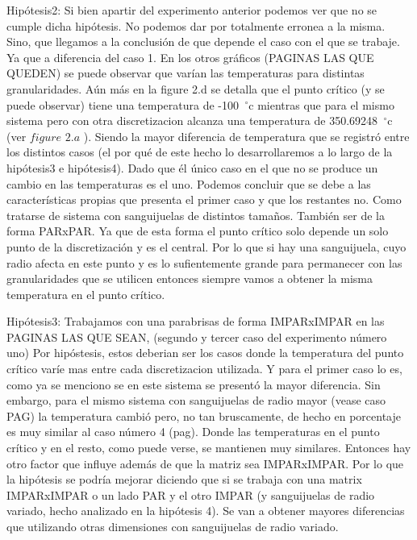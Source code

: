 Hipótesis2: Si bien apartir del experimento anterior podemos ver que no se cumple dicha hipótesis. No podemos dar por totalmente erronea a la misma. Sino, que llegamos a la conclusión de que depende el caso con el que se trabaje. Ya que a diferencia del caso 1. En los otros gráficos (PAGINAS LAS QUE QUEDEN) se puede observar que varían las temperaturas para distintas granularidades. Aún más en la figure 2.d se detalla que el punto crítico (y se puede observar) tiene una temperatura de -100\hspace{-1.5mm}$\phantom{a}^{\circ}$c mientras que para el mismo sistema pero con otra discretizacion alcanza una temperatura de  350.69248\hspace{-1.5mm}$\phantom{a}^{\circ}$c (ver $figure$ $2.a$ ). Siendo la mayor diferencia de temperatura que se registró entre los distintos casos (el por qué de este hecho lo desarrollaremos a lo largo de la hipótesis3 e hipótesis4). Dado que él único caso en el que no se produce un cambio en las temperaturas es el uno. Podemos concluir que se debe a las características propias que presenta el primer caso y que los restantes no. Como tratarse de sistema con sanguijuelas de distintos tamaños. También ser de la forma PARxPAR. Ya que de esta forma el punto crítico solo depende un solo punto de la discretización y es el central. Por lo que si hay una sanguijuela, cuyo radio afecta en este punto y es lo sufientemente grande para permanecer con las granularidades que se utilicen entonces siempre vamos a obtener la misma temperatura en el punto crítico. \newline \newline


Hipótesis3: Trabajamos con una parabrisas de forma IMPARxIMPAR en las PAGINAS LAS QUE SEAN, (segundo y tercer caso del experimento número uno) Por hipóstesis, estos deberian ser los casos donde la temperatura del punto crítico varíe mas entre cada discretizacion utilizada. Y para el primer caso lo es, como ya se menciono se en este sistema se presentó la mayor diferencia. Sin embargo, para el mismo sistema con sanguijuelas de radio mayor (vease caso PAG) la temperatura cambió pero, no tan bruscamente, de hecho en porcentaje es muy similar al caso número 4 (pag). Donde las temperaturas en el punto crítico y en el resto, como puede verse, se mantienen muy similares. Entonces hay otro factor que influye además de que la matriz sea IMPARxIMPAR. Por lo que la hipótesis se podría mejorar diciendo que si se trabaja con una matrix IMPARxIMPAR o un lado PAR y el otro IMPAR (y sanguijuelas de radio variado, hecho analizado en la hipótesis 4). Se van a obtener mayores diferencias que utilizando otras dimensiones con sanguijuelas de radio variado.\newline \newline



